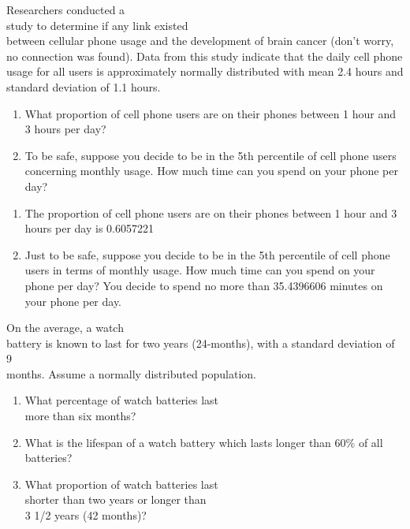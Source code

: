 \documentclass[11pt, chapterprefix=true]{scrbook}\usepackage[]{graphicx}\usepackage[]{color}
\begin{document}
\begin{exercises}
  \begin{exercise} %

Researchers conducted a \\ study to determine if any link existed \\ between cellular phone usage and the development of brain cancer (don't worry, no connection was found).  Data from this study indicate that the daily cell phone usage for all users is approximately normally distributed with mean 2.4 hours and standard deviation of 1.1  hours.

	\begin{enumerate}
	\item What proportion of cell phone users are on their phones between 1 hour
and 3 hours per day?
  \item To be safe, suppose you decide to be in the 5th percentile of
cell phone users concerning monthly usage.  How much time can you spend on your phone per day?
	\end{enumerate}

	\end{exercise}
	\begin{solution}  %


\begin{enumerate}
	\item The proportion of cell phone users are on their phones between 1 hour
and 3 hours per day is 0.6057221
  \item Just to be safe, suppose you decide to be in the 5th percentile of
cell phone users in terms of monthly usage.  How much time can you spend on your phone per day? You decide to spend no more than 35.4396606 minutes on your phone per day.
	\end{enumerate}
	\end{solution}

  \begin{exercise} %

On the average, a watch \\ battery is known to last for two years (24-months), with a standard deviation of 9 \\ months. Assume a normally distributed population.

 \begin{enumerate}
	\item What percentage of watch batteries last \\ more than six months?
	\item What is the lifespan of a watch battery which lasts longer than 60\% of all batteries?
	\item What proportion of watch batteries last \\ shorter than two years or longer than \\ 3 1/2 years (42 months)?
 \end{enumerate}


\end{exercise}
\end{exercises}
\end{document}

